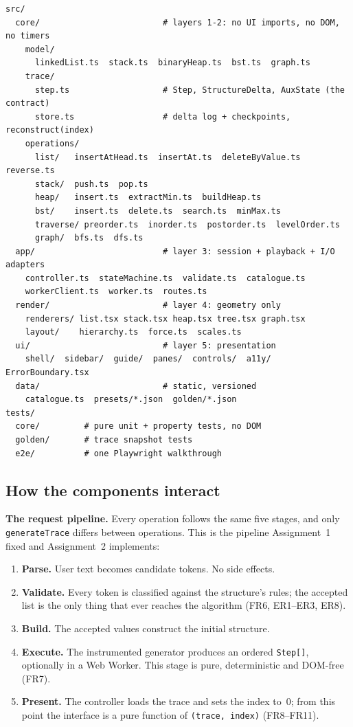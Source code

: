 \documentclass[11pt,a4paper]{article}
\newcommand{\ct}[1]{\texttt{#1}}
\begin{document}
\begin{lstlisting}[style=ts,caption={Proposed source layout. One module per structure, one file per
operation; the trace types live in exactly one place so generator and renderer cannot drift.},
label={lst:layout}]
src/
  core/                         # layers 1-2: no UI imports, no DOM, no timers
    model/
      linkedList.ts  stack.ts  binaryHeap.ts  bst.ts  graph.ts
    trace/
      step.ts                   # Step, StructureDelta, AuxState (the contract)
      store.ts                  # delta log + checkpoints, reconstruct(index)
    operations/
      list/   insertAtHead.ts  insertAt.ts  deleteByValue.ts  reverse.ts
      stack/  push.ts  pop.ts
      heap/   insert.ts  extractMin.ts  buildHeap.ts
      bst/    insert.ts  delete.ts  search.ts  minMax.ts
      traverse/ preorder.ts  inorder.ts  postorder.ts  levelOrder.ts
      graph/  bfs.ts  dfs.ts
  app/                          # layer 3: session + playback + I/O adapters
    controller.ts  stateMachine.ts  validate.ts  catalogue.ts
    workerClient.ts  worker.ts  routes.ts
  render/                       # layer 4: geometry only
    renderers/ list.tsx stack.tsx heap.tsx tree.tsx graph.tsx
    layout/    hierarchy.ts  force.ts  scales.ts
  ui/                           # layer 5: presentation
    shell/  sidebar/  guide/  panes/  controls/  a11y/  ErrorBoundary.tsx
  data/                         # static, versioned
    catalogue.ts  presets/*.json  golden/*.json
tests/
  core/         # pure unit + property tests, no DOM
  golden/       # trace snapshot tests
  e2e/          # one Playwright walkthrough
\end{lstlisting}

\subsection{How the components interact}

\noindent\textbf{The request pipeline.} Every operation follows the same five stages, and only
\ct{generateTrace} differs between operations. This is the pipeline Assignment~1 fixed and
Assignment~2 implements:

\begin{enumerate}[leftmargin=1.6em,topsep=2pt,itemsep=2pt]
  \item \textbf{Parse.} User text becomes candidate tokens. No side effects.
  \item \textbf{Validate.} Every token is classified against the structure's rules; the accepted
        list is the only thing that ever reaches the algorithm (FR6, ER1--ER3, ER8).
  \item \textbf{Build.} The accepted values construct the initial structure.
  \item \textbf{Execute.} The instrumented generator produces an ordered \ct{Step[]}, optionally
        in a Web Worker. This stage is pure, deterministic and DOM-free (FR7).
  \item \textbf{Present.} The controller loads the trace and sets the index to~$0$; from this point
        the interface is a pure function of \ct{(trace, index)} (FR8--FR11).
\end{enumerate}
\end{document}
